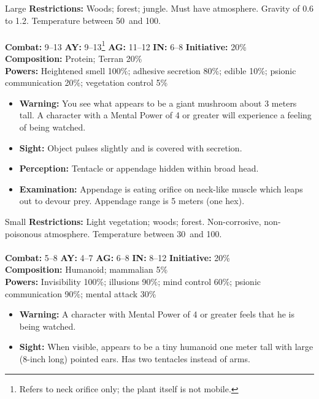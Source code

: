 \hrulefill

\begin{creature}{Large}
\textbf{Restrictions:} Woods; forest; jungle. Must have
 atmosphere. Gravity of 0.6 to 1.2. Temperature between 50\textdegree\
 and 100\textdegree.\\\\
\textbf{Combat:} 9--13 
\textbf{AY:} 9--13\footnote{Refers to neck orifice only; the plant itself is not mobile.} \textbf{AG:} 11--12 \textbf{IN:} 6--8 \textbf{Initiative:} 20\% \\
\textbf{Composition:} Protein; Terran 20\% \\
\textbf{Powers:} Heightened smell 100\%; adhesive secretion 80\%; edible 10\%; psionic communication 20\%; vegetation control 5\% 
\begin{itemize}
\item \textbf{Warning:} You see what appears to be a giant mushroom about 3 meters tall. A character with a Mental Power of 4 or greater will 
experience a feeling of being watched. 
\item \textbf{Sight:} Object pulses slightly and is covered with secretion. 
\item \textbf{Perception:} Tentacle or appendage hidden within broad head. 
\item \textbf{Examination:} Appendage is eating orifice on neck-like muscle which leaps out to devour prey. Appendage range is 5 meters (one 
hex). 
\end{itemize}
\end{creature}

\hrulefill

\begin{creature}{Small}
\textbf{Restrictions:} Light vegetation; woods; forest. Non-corrosive, non-poisonous atmosphere. Temperature between 30\textdegree\ and 100\textdegree. \\\\
\textbf{Combat:} 5--8 \textbf{AY:} 4--7 \textbf{AG:} 6--8 \textbf{IN:} 8--12 \textbf{Initiative:} 20\% \\
\textbf{Composition:} Humanoid; mammalian 5\% \\
\textbf{Powers:} Invisibility 100\%; illusions 90\%; mind control 60\%; psionic communication 90\%; mental attack 30\% 
\begin{itemize}
\item \textbf{Warning:} A character with Mental Power of 4 or greater feels that he is being watched. 
\item \textbf{Sight:} When visible, appears to be a tiny humanoid one meter tall with large (8-inch long) pointed ears. Has two tentacles instead of 
arms. 
\end{itemize}
\end{creature}

